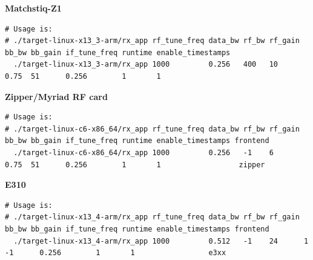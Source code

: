 \noindent\textbf{Matchstiq-Z1}
\scriptsize
\begin{verbatim}
# Usage is:
# ./target-linux-x13_3-arm/rx_app rf_tune_freq data_bw rf_bw rf_gain bb_bw bb_gain if_tune_freq runtime enable_timestamps
  ./target-linux-x13_3-arm/rx_app 1000         0.256   400   10      0.75  51      0.256        1       1
\end{verbatim}
\par\medskip
\small

\noindent\textbf{Zipper/Myriad RF card}
\scriptsize
\noindent
\begin{verbatim}
# Usage is:
# ./target-linux-c6-x86_64/rx_app rf_tune_freq data_bw rf_bw rf_gain bb_bw bb_gain if_tune_freq runtime enable_timestamps frontend
  ./target-linux-c6-x86_64/rx_app 1000         0.256   -1    6       0.75  51      0.256        1       1                  zipper
\end{verbatim}
\small
\par\medskip

\noindent\textbf{E310}
\scriptsize
\noindent
\begin{verbatim}
# Usage is:
# ./target-linux-x13_4-arm/rx_app rf_tune_freq data_bw rf_bw rf_gain bb_bw bb_gain if_tune_freq runtime enable_timestamps frontend
  ./target-linux-x13_4-arm/rx_app 1000         0.512   -1    24      1     -1      0.256        1       1                 e3xx
\end{verbatim}
\small
\par\medskip

